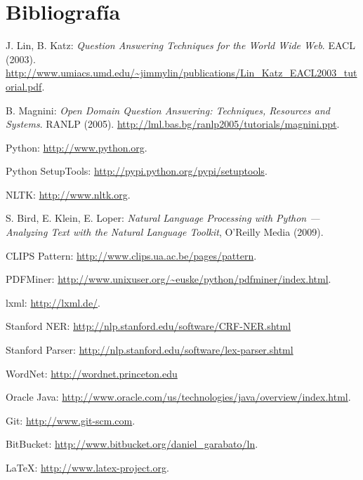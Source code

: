 \documentclass[12pt,a4paper,titlepage]{article}
\begin{document}
\section{Bibliografía}
\renewcommand{\section}[2]{}
\begin{thebibliography}{9}

J. Lin, B. Katz: \emph{Question Answering Techniques for the World Wide Web}. EACL (2003). \url{http://www.umiacs.umd.edu/~jimmylin/publications/Lin_Katz_EACL2003_tutorial.pdf}.

B. Magnini: \emph{Open Domain Question Answering: Techniques, Resources and Systems}. RANLP (2005). \url{http://lml.bas.bg/ranlp2005/tutorials/magnini.ppt}.

Python: \url{http://www.python.org}.

Python SetupTools: \url{http://pypi.python.org/pypi/setuptools}.

NLTK: \url{http://www.nltk.org}.

S. Bird, E. Klein, E. Loper: \emph{Natural Language Processing with Python --- Analyzing Text with the Natural Language Toolkit}, O'Reilly Media (2009).

CLIPS Pattern: \url{http://www.clips.ua.ac.be/pages/pattern}.

PDFMiner: \url{http://www.unixuser.org/~euske/python/pdfminer/index.html}.

lxml: \url{http://lxml.de/}.

Stanford NER: \url{http://nlp.stanford.edu/software/CRF-NER.shtml}

Stanford Parser: \url{http://nlp.stanford.edu/software/lex-parser.shtml}

WordNet: \url{http://wordnet.princeton.edu}

Oracle Java: \url{http://www.oracle.com/us/technologies/java/overview/index.html}.

Git: \url{http://www.git-scm.com}.

BitBucket: \url{http://www.bitbucket.org/daniel_garabato/ln}.

\LaTeX: \url{http://www.latex-project.org}.


\end{thebibliography}
\end{document}
